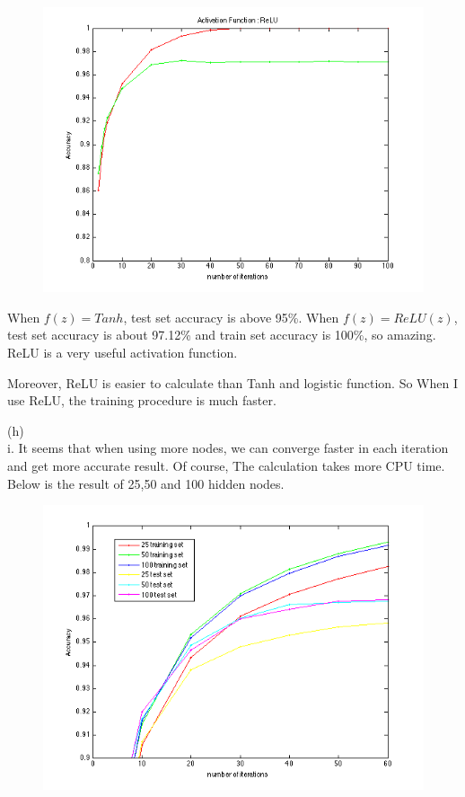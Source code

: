 \documentclass{article} %
\begin{document}
\begin{figure}[htbp] %
   \centering
   \includegraphics[width=5in]{img/p72.png} 
\end{figure}

When $f(z) = Tanh$, test set accuracy is above 95\%. When $f(z) = ReLU(z)$, test set accuracy is about 97.12\%  and train set accuracy is 100\%, so amazing. ReLU is a very useful activation function.

Moreover, ReLU is easier to calculate than Tanh and logistic function. So When I use ReLU, the training procedure is much faster.

\pagebreak

(h) \\

i. It seems that when using more nodes, we can converge faster in each iteration and get more accurate result. Of course, The calculation takes more CPU time. Below is the result of 25,50 and 100 hidden nodes.

\begin{figure}[htbp] %
   \centering
   \includegraphics[width=5in]{img/p81.png} 
\end{figure}
\end{document}
